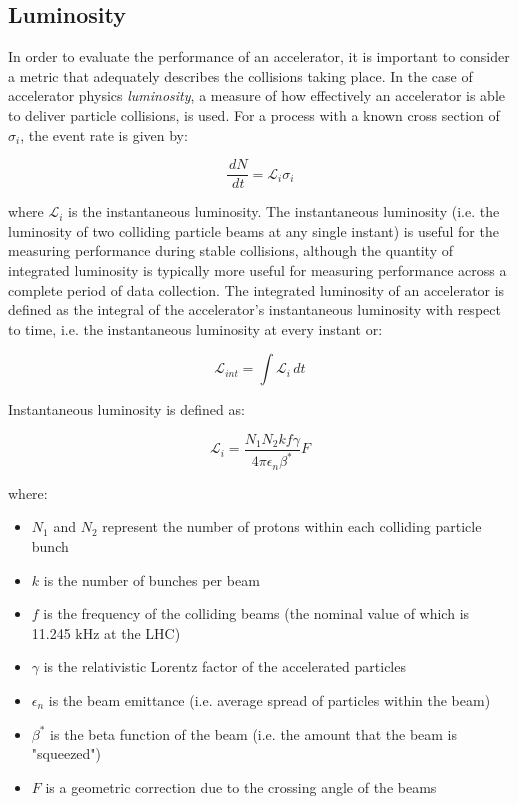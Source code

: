 \documentclass[12pt,a4paper,epsf,portrait,times,epsfig]{report}
\begin{document}

		\subsection{Luminosity}

		In order to evaluate the performance of an accelerator, it is important to consider a metric that adequately describes the collisions taking place. In the case of accelerator physics \textit{luminosity}, a measure of how effectively an accelerator is able to deliver particle collisions, is used. For a process with a known cross section of $\sigma_{i}$, the event rate is given by:
		
		\begin{equation}
			\frac{\,dN}{\,dt} = \mathcal{L}_{i}\sigma_{i}
		\end{equation}

		where $\mathcal{L}_{i}$ is the instantaneous luminosity. The instantaneous luminosity (i.e. the luminosity of two colliding particle beams at any single instant) is useful for the measuring performance during stable collisions, although the quantity of integrated luminosity is typically more useful for measuring performance across a complete period of data collection. The integrated luminosity of an accelerator is defined as the integral of the accelerator's instantaneous luminosity with respect to time, i.e. the instantaneous luminosity at every instant or:
		
		\begin{equation}
			\mathcal{L}_{int} = \int \mathcal{L}_{i} \,dt 			
		\end{equation}

		Instantaneous luminosity is defined as: 

		\begin{equation}
			\mathcal{L}_{i} = \frac{N_{1}N_{2}kf\gamma}{4\pi\epsilon_{n}\beta^{*}}F
		\end{equation}
		
		where:

		\begin{itemize}
			\item $N_{1}$ and $N_{2}$ represent the number of protons within each colliding particle bunch
			\item $k$ is the number of bunches per beam
			\item $f$ is the frequency of the colliding beams (the nominal value of which is 11.245 kHz at the LHC)
			\item $\gamma$ is the relativistic Lorentz factor of the accelerated particles
			\item $\epsilon_{n}$ is the beam emittance (i.e. average spread of particles within the beam)
			\item $\beta^{*}$ is the beta function of the beam (i.e. the amount that the beam is "squeezed")
			\item $F$ is a geometric correction due to the crossing angle of the beams
		\end{itemize}
\end{document}
